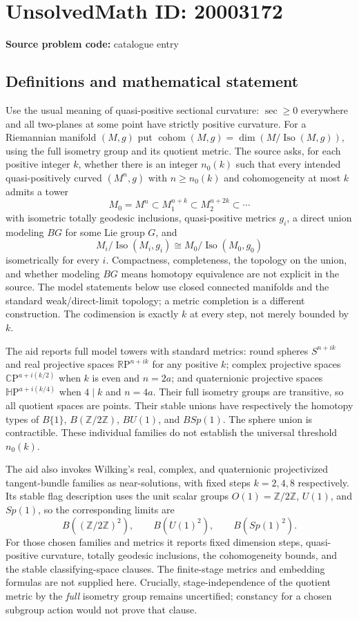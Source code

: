 \documentclass[11pt]{article}
\newcommand{\Z}{\mathbb{Z}}
\newcommand{\R}{\mathbb{R}}
\newcommand{\C}{\mathbb{C}}
\begin{document}
\section*{UnsolvedMath ID: 20003172}
\textbf{Source problem code:} catalogue entry
\subsection{Definitions and mathematical statement}
Use the usual meaning of quasi-positive sectional curvature: $\sec\geq0$ everywhere and all two-planes at some point have strictly positive curvature. For a Riemannian manifold $(M,g)$ put $\operatorname{cohom}(M,g)=\dim(M/\operatorname{Iso}(M,g))$, using the full isometry group and its quotient metric. The source asks, for each positive integer $k$, whether there is an integer $n_0(k)$ such that every intended quasi-positively curved $(M^n,g)$ with $n\geq n_0(k)$ and cohomogeneity at most $k$ admits a tower
\[
M_0=M^n\subset M_1^{n+k}\subset M_2^{n+2k}\subset\cdots
\]
with isometric totally geodesic inclusions, quasi-positive metrics $g_i$, a direct union modeling $BG$ for some Lie group $G$, and
\[
M_i/\operatorname{Iso}(M_i,g_i)\cong M_0/\operatorname{Iso}(M_0,g_0)
\]
isometrically for every $i$. Compactness, completeness, the topology on the union, and whether modeling $BG$ means homotopy equivalence are not explicit in the source. The model statements below use closed connected manifolds and the standard weak/direct-limit topology; a metric completion is a different construction. The codimension is exactly $k$ at every step, not merely bounded by $k$.

The aid reports full model towers with standard metrics: round spheres $S^{n+ik}$ and real projective spaces $\R\mathrm P^{n+ik}$ for any positive $k$; complex projective spaces $\C\mathrm P^{a+i(k/2)}$ when $k$ is even and $n=2a$; and quaternionic projective spaces $\mathbb H\mathrm P^{a+i(k/4)}$ when $4\mid k$ and $n=4a$. Their full isometry groups are transitive, so all quotient spaces are points. Their stable unions have respectively the homotopy types of $B\{1\}$, $B(\Z/2\Z)$, $BU(1)$, and $BSp(1)$. The sphere union is contractible. These individual families do not establish the universal threshold $n_0(k)$.

The aid also invokes Wilking's real, complex, and quaternionic projectivized tangent-bundle families as near-solutions, with fixed steps $k=2,4,8$ respectively. Its stable flag description uses the unit scalar groups $O(1)=\Z/2\Z$, $U(1)$, and $Sp(1)$, so the corresponding limits are
\[
B((\Z/2\Z)^2),\qquad B(U(1)^2),\qquad B(Sp(1)^2).
\]
For those chosen families and metrics it reports fixed dimension steps, quasi-positive curvature, totally geodesic inclusions, the cohomogeneity bounds, and the stable classifying-space clauses. The finite-stage metrics and embedding formulas are not supplied here. Crucially, stage-independence of the quotient metric by the \emph{full} isometry group remains uncertified; constancy for a chosen subgroup action would not prove that clause.
\end{document}
